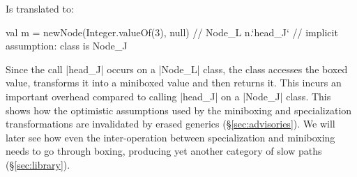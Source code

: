 Is translated to:

\begin{lstlisting-nobreak}
 val m = newNode(Integer.valueOf(3), null) // Node_L
 n.`head_J`        // implicit assumption: class is Node_J
\end{lstlisting-nobreak}

Since the call |head_J| occurs on a |Node_L| class, the class accesses the boxed value, transforms it into a miniboxed value and then returns it. This incurs an important overhead compared to calling |head_J| on a |Node_J| class. This shows how the optimistic assumptions used by the miniboxing and specialization transformations are invalidated by erased generics (\S\ref{sec:advisories}). We will later see how even the inter-operation between specialization and miniboxing needs to go through boxing, producing yet another category of slow paths (\S\ref{sec:library}).

